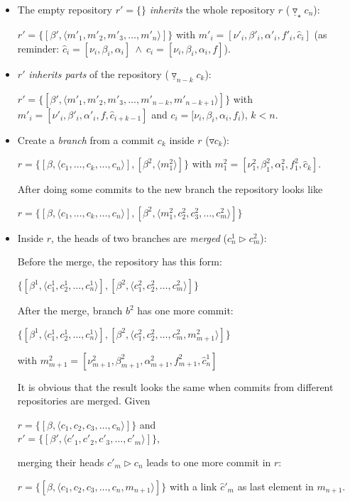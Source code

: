 \documentclass[fleqn, 10pt, a4paper]{article}
\begin{document}
\begin{itemize}
\item The empty repository $r'=\{\}$ \emph{inherits} the whole repository $r$
($\underline\triangledown_\star c_n$):

$r' = \{[\beta', \langle m'_1, m'_2, m'_3, \ldots, m'_n\rangle]\}$ with
$m'_i = [\nu'_i, \beta'_i, \alpha'_i, f'_i, \hat c_i]$ (as reminder:
$\hat c_i = [\nu_i, \beta_i, \alpha_i]\ \wedge\ c_i=[\nu_i, \beta_i, \alpha_i, f]$).

\item $r'$ \emph{inherits parts} of the repository ($\underline\triangledown_
{n-k}c_k$):

$r'=\{[\beta', \langle m'_1, m'_2, m'_3, \ldots, m'_{n-k}, m'_{n-k+1}\rangle]\}$ with
$m'_i=[\nu'_i, \beta'_i, \alpha'_i, f, \hat c_{i+k-1}]$ and
$c_{i}=[\nu_i, \beta_i, \alpha_i, f_i)$, $k<n$.

\item Create a \emph{branch} from a commit $c_k$ inside $r$
($\triangledown c_k$):

$r = \{[\beta, \langle c_1, \ldots, c_k, \ldots, c_n\rangle], [\beta^2, \langle m_1^2
\rangle]\}$ with $m_1^2=[\nu_1^2, \beta_1^2, \alpha_1^2, f_1^2, \hat c_k]$.

After doing some commits to the new branch the repository looks like

$r = \{[\beta, \langle c_1, \ldots, c_k, \ldots, c_n\rangle], [\beta^2, \langle m_1^2,
c_2^2, c_3^2, \ldots, c_m^2\rangle ]\}$

\item Inside $r$, the heads of two branches are \emph{merged}
($c_n^1 \rhd
 c_m^2$):

Before the merge, the repository has this form:

$\{[\beta^1, \langle c_1^1, c_2^1, \ldots, c_n^1\rangle],
[\beta^2, \langle c_1^2, c_2^2, \ldots, c_m^2\rangle]\}$	

After the merge, branch $b^2$ has one more commit:

$\{[\beta^1, \langle c_1^1, c_2^1, \ldots, c_n^1\rangle],
[\beta^2, \langle c_1^2, c_2^2, \ldots, c_m^2, m_{m+1}^2\rangle]\}$

with $m_{m+1}^2=[\nu_{m+1}^2, \beta_{m+1}^2, \alpha_{m+1}^2, f_{m+1}^2,
\hat c_n^1]$

It is obvious that the result looks the same when commits
from different repositories are merged. Given

$r = \{[\beta, \langle c_1, c_2, c_3, \ldots, c_n\rangle]\}$ and \\
$r' = \{[\beta', \langle c'_1, c'_2, c'_3, \ldots, c'_m\rangle]\}$,

merging their heads $c'_m \rhd c_n$ leads to one more commit in
$r$:

$r = \{[\beta, \langle c_1, c_2, c_3, \ldots, c_n, m_{n+1}\rangle]\}$
with a link $\hat c'_m$ as last element in $m_{n+1}$.
\end{itemize}
\end{document}
